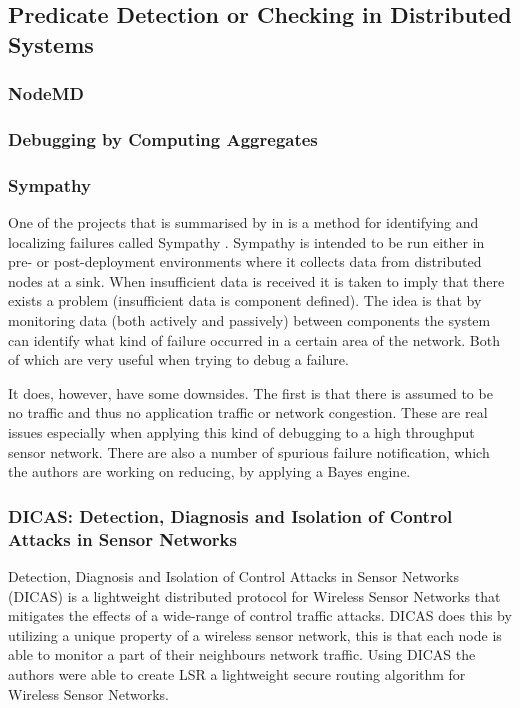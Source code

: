 \subsection{Predicate Detection or Checking in Distributed Systems}

\subsubsection*{NodeMD}
\cite{NodeMD}


\subsubsection*{Debugging by Computing Aggregates}
\cite{1203364}

\subsubsection*{Sympathy}

One of the projects that is summarised by \citeauthor{herbert2007adaptive} in \cite{herbert2007adaptive} is a method for identifying and localizing failures called Sympathy \cite{ramanathan2005sympathy}. Sympathy is intended to be run either in pre- or post-deployment environments where it collects data from distributed nodes at a sink. When insufficient data is received it is taken to imply that there exists a problem (insufficient data is component defined). The idea is that by monitoring data (both actively and passively) between components the system can identify what kind of failure occurred in a certain area of the network. Both of which are very useful when trying to debug a failure.

It does, however, have some downsides. The first is that there is assumed to be no traffic and thus no application traffic or network congestion. These are real issues especially when applying this kind of debugging to a high throughput sensor network. There are also a number of spurious failure notification, which the authors are working on reducing, by applying a Bayes engine.

\subsubsection*{DICAS: Detection, Diagnosis and Isolation of Control Attacks in Sensor Networks}

Detection, Diagnosis and Isolation of Control Attacks in Sensor Networks (DICAS) \cite{dicaspaper} is a lightweight distributed protocol for Wireless Sensor Networks that mitigates the effects of a wide-range of control traffic attacks. DICAS does this by utilizing a unique property of a wireless sensor network, this is that each node is able to monitor a part of their neighbours network traffic. Using DICAS the authors were able to create LSR a lightweight secure routing algorithm for Wireless Sensor Networks.

